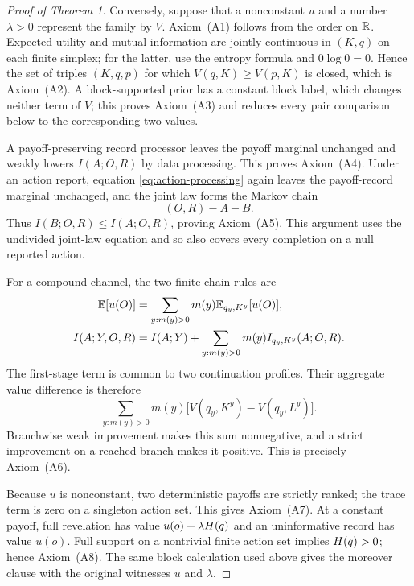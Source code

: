 \begin{proof}[Proof of Theorem 1]
Conversely, suppose that a nonconstant $u$ and a number $\lambda>0$ represent
the family by $V$.  Axiom~\textup{(A1)} follows from the order on $\mathbb R$.
Expected utility and mutual information are jointly continuous in $(K,q)$ on
each finite simplex; for the latter, use the entropy formula and $0\log0=0$.
Hence the set of triples $(K,q,p)$ for which $V(q,K)\ge V(p,K)$ is closed,
which is Axiom~\textup{(A2)}.  A block-supported prior has a constant block
label, which changes neither term of $V$; this proves Axiom~\textup{(A3)} and
reduces every pair comparison below to the corresponding two values.

A payoff-preserving record processor leaves the payoff marginal unchanged and
weakly lowers $I(A;O,R)$ by data processing.  This proves
Axiom~\textup{(A4)}.  Under an action report, equation
\eqref{eq:action-processing} again leaves the payoff-record marginal unchanged,
and the joint law forms the Markov chain
\[
(O,R)-A-B.
\]
Thus $I(B;O,R)\le I(A;O,R)$, proving Axiom~\textup{(A5)}.  This argument uses
the undivided joint-law equation and so also covers every completion on a null
reported action.

For a compound channel, the two finite chain rules are
\begin{align*}
\mathbb E[u(O)]
  &=\sum_{y:m(y)>0} m(y)\mathbb E_{q_y,K^y}[u(O)],\\
I(A;Y,O,R)
  &=I(A;Y)+\sum_{y:m(y)>0} m(y)I_{q_y,K^y}(A;O,R).
\end{align*}
The first-stage term is common to two continuation profiles.  Their aggregate
value difference is therefore
\[
\sum_{y:m(y)>0} m(y)\bigl[V(q_y,K^y)-V(q_y,L^y)\bigr].
\]
Branchwise weak improvement makes this sum nonnegative, and a strict
improvement on a reached branch makes it positive.  This is precisely
Axiom~\textup{(A6)}.

Because $u$ is nonconstant, two deterministic payoffs are strictly ranked; the
trace term is zero on a singleton action set.  This gives
Axiom~\textup{(A7)}.  At a constant payoff, full revelation has
value $u(o)+\lambda H(q)$ and an uninformative record has value $u(o)$.
Full support on a nontrivial finite action set implies $H(q)>0$; hence
Axiom~\textup{(A8)}.  The same block calculation used above gives the moreover
clause with the original witnesses $u$ and $\lambda$.
\end{proof}
